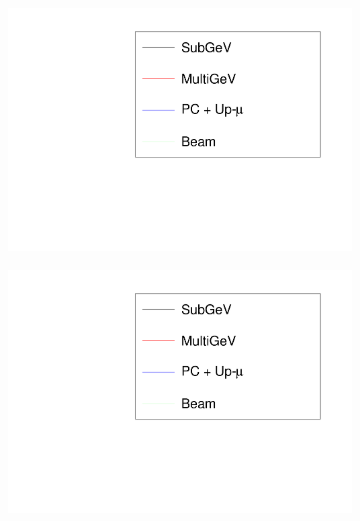 \begin{figure}[h]
\begin{subfigure}[t]{0.5\textwidth}
    \includegraphics[width=\textwidth, trim={0mm 0mm 0mm 0mm}, clip,page=8]{Figures/OA/LLHScans_Osc.pdf}
  \end{subfigure}%
  \begin{subfigure}[t]{0.5\textwidth}
    \includegraphics[width=\textwidth, trim={0mm 0mm 0mm 0mm}, clip,page=5]{Figures/OA/LLHScans_Osc.pdf}
  \end{subfigure}
  \begin{subfigure}[t]{0.5\textwidth}

\end{subfigure}
\end{figure}
